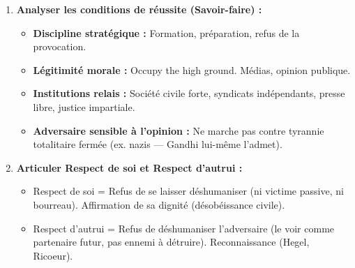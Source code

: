\documentclass[11pt]{article}
\newcommand{\cle}[1]{{\popxbold\color{popdark}#1}}
\begin{document}
\begin{methode}
\begin{enumerate}
\begin{itemize}
        \end{itemize}
    \item \textbf{Analyser les conditions de réussite (Savoir-faire) :}
        \begin{itemize}
            \item \textbf{Discipline stratégique :} Formation, préparation, refus de la provocation.
            \item \textbf{Légitimité morale :} Occupy the high ground. Médias, opinion publique.
            \item \textbf{Institutions relais :} Société civile forte, syndicats indépendants, presse libre, justice impartiale.
            \item \textbf{Adversaire sensible à l'opinion :} Ne marche pas contre tyrannie totalitaire fermée (ex. nazis — Gandhi lui-même l'admet).
        \end{itemize}
    \item \textbf{Articuler \cle{Respect de soi} et \cle{Respect d'autrui} :}
        \begin{itemize}
            \item Respect de soi = Refus de se laisser déshumaniser (ni victime passive, ni bourreau). Affirmation de sa dignité (désobéissance civile).
            \item Respect d'autrui = Refus de déshumaniser l'adversaire (le voir comme partenaire futur, pas ennemi à détruire). \cle{Reconnaissance} (Hegel, Ricoeur).
        \end{itemize}
\end{enumerate}
\end{methode}
\end{document}
